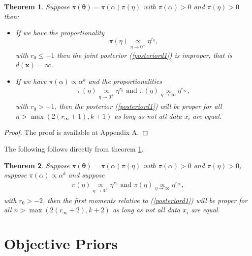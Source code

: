 \documentclass[12pt]{interact}
\theoremstyle{plain}%
\newtheorem{theorem}{Theorem}[section]
\theoremstyle{definition}
\theoremstyle{remark}
\begin{document}
\begin{theorem}\label{theoprinc} Suppose $\pi(\boldsymbol{\theta})=\pi(\alpha)\pi(\eta)$ with $\pi(\alpha)>0$ and $\pi(\eta)>0$ then:
\begin{itemize}
\item[i)] If we have the proportionality
\begin{equation*}
\pi(\eta) \underset{\eta\to 0^+}{\propto} \eta^{r_0},
\end{equation*}
\noindent with $r_0\leq -1$ then the joint posterior (\ref{posteriord1}) is improper, that is $d(\boldsymbol{x})=\infty$.
\item[ii)] If we have $\pi(\alpha)\propto \alpha^k$ and the proportionalities
\begin{equation*}
\begin{aligned}
\pi(\eta) \underset{\eta\to 0^+}{\propto} \eta^{r_0}\mbox{ and } \pi(\eta) \underset{\eta\to \infty}{\propto} \eta^{r_{\infty}},
\end{aligned}
\end{equation*}
with $r_0>-1$, then the posterior (\ref{posteriord1}) will be proper for all $n>\max(2(r_\infty+1),k+1)$ as long as not all data $x_i$ are equal.
\end{itemize}
\end{theorem}

\begin{proof}
The proof is available at Appendix A.
\end{proof}

The following follows directly from theorem \ref{theoprinc}.

\begin{theorem}\label{theosecond} Suppose $\pi(\boldsymbol{\theta})=\pi(\alpha)\pi(\eta)$ with $\pi(\alpha)>0$ and $\pi(\eta)>0$, suppose $\pi(\alpha)\propto \alpha^k$ and suppose
\begin{equation*}
\begin{aligned}
\pi(\eta) \underset{\eta\to 0^+}{\propto} \eta^{r_0}\mbox{ and } \pi(\eta) \underset{\eta\to \infty}{\propto} \eta^{r_{\infty}},
\end{aligned}
\end{equation*}
with $r_0>-2$, then the first moments relative to (\ref{posteriord1}) will be proper for all $n>\max(2(r_\infty+2),k+2)$ as long as not all data $x_i$ are equal.

\end{theorem}

\section{Objective Priors}
\end{document}
